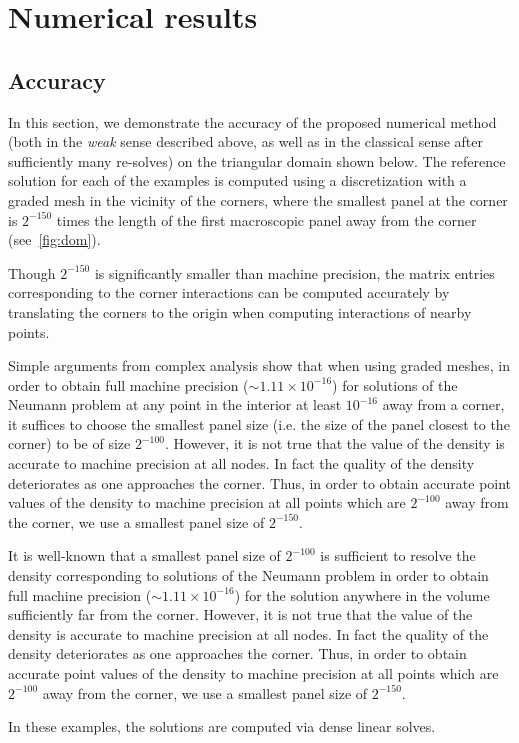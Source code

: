 
\section{Numerical results}
\subsection{Accuracy}
In this section, we demonstrate the accuracy of the proposed numerical method (both in the {\it weak} sense 
described above, 
as well as in the classical sense after sufficiently many re-solves) on the triangular domain shown below. 
The reference solution for each of the examples is computed using a discretization with
a graded mesh in the vicinity of the corners, where the smallest panel at the corner is $2^{-150}$ times
the length of the first macroscopic panel away from the corner (see~\cref{fig:dom}). 
\begin{rem}
Though $2^{-150}$ is significantly smaller than machine precision, the matrix entries corresponding to the
corner interactions can be computed accurately by translating the corners to the origin when 
computing interactions of nearby points.
\end{rem} 
\begin{rem}
Simple arguments from complex analysis show that when using graded meshes, in order to obtain full 
machine precision 
($\sim 1.11 \times 10^{-16}$) for solutions of the Neumann problem at any point in the interior 
at least $10^{-16}$ away from a corner, it suffices to choose the smallest panel size (i.e. the size of the 
panel closest to the corner) to be of size $2^{-100}.$ However, it is not true that the value of the density is 
accurate to machine precision at all nodes. In fact the quality
of the density deteriorates as one approaches the corner. Thus, in order to obtain accurate point values
of the density to machine precision at all points which are $2^{-100}$ away from the corner, we use a smallest
panel size of $2^{-150}$. 

It is well-known that a smallest panel size of $2^{-100}$ is sufficient to resolve the density corresponding
to solutions of the Neumann problem in order to obtain full machine precision ($\sim 1.11 \times 10^{-16}$) for the solution anywhere in the volume sufficiently far from the corner.
However, it is not true that the value of the density is accurate to machine precision at all nodes. In fact the quality
of the density deteriorates as one approaches the corner. Thus, in order to obtain accurate point values
of the density to machine precision at all points which are $2^{-100}$ away from the corner, we use a smallest
panel size of $2^{-150}$. 
\end{rem}
In these examples, the solutions are computed via dense linear solves.

